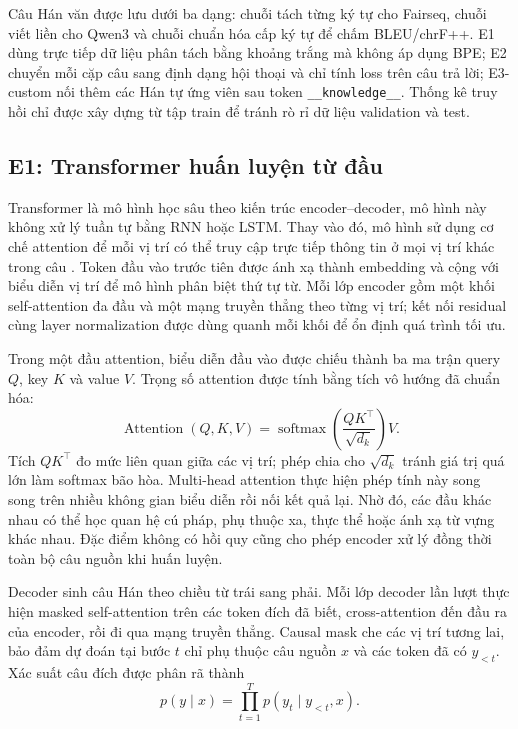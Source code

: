 \documentclass[11pt,twocolumn]{article}
\begin{document}
Câu Hán văn được lưu dưới ba dạng: chuỗi tách từng ký tự cho Fairseq, chuỗi
viết liền cho Qwen3 và chuỗi chuẩn hóa cấp ký tự để chấm BLEU/chrF++. E1 dùng
trực tiếp dữ liệu phân tách bằng khoảng trắng mà không áp dụng BPE; E2 chuyển
mỗi cặp câu sang định dạng hội thoại và chỉ tính loss trên câu trả lời;
E3-custom nối thêm các Hán tự ứng viên sau token
\texttt{\_\_knowledge\_\_}. Thống kê truy hồi chỉ được xây dựng từ tập train
để tránh rò rỉ dữ liệu validation và test.

\subsection{E1: Transformer huấn luyện từ đầu}

Transformer là mô hình học sâu theo kiến trúc encoder--decoder,
mô hình này không xử lý tuần tự bằng RNN hoặc LSTM. Thay vào đó, mô hình sử dụng cơ
chế attention để mỗi vị trí có thể truy cập trực tiếp thông tin ở mọi vị trí
khác trong câu \citep{vaswani2017attention}. Token đầu vào trước tiên được ánh
xạ thành embedding và cộng với biểu diễn vị trí để mô hình phân biệt thứ tự
từ. Mỗi lớp encoder gồm một khối self-attention đa đầu và một mạng truyền thẳng
theo từng vị trí; kết nối residual cùng layer normalization được dùng quanh
mỗi khối để ổn định quá trình tối ưu.

Trong một đầu attention, biểu diễn đầu vào được chiếu thành ba ma trận query
$Q$, key $K$ và value $V$. Trọng số attention được tính bằng tích vô hướng đã
chuẩn hóa:
\begin{equation}
\operatorname{Attention}(Q,K,V)
=\operatorname{softmax}\!\left(\frac{QK^{\top}}{\sqrt{d_k}}\right)V.
\end{equation}
Tích $QK^{\top}$ đo mức liên quan giữa các vị trí; phép chia cho
$\sqrt{d_k}$ tránh giá trị quá lớn làm softmax bão hòa. Multi-head attention
thực hiện phép tính này song song trên nhiều không gian biểu diễn rồi nối kết
quả lại. Nhờ đó, các đầu khác nhau có thể học quan hệ cú pháp, phụ thuộc xa,
thực thể hoặc ánh xạ từ vựng khác nhau. Đặc điểm không có hồi quy cũng cho phép
encoder xử lý đồng thời toàn bộ câu nguồn khi huấn luyện.

Decoder sinh câu Hán theo chiều từ trái sang phải. Mỗi lớp decoder lần lượt
thực hiện masked self-attention trên các token đích đã biết, cross-attention
đến đầu ra của encoder, rồi đi qua mạng truyền thẳng. Causal mask che các vị
trí tương lai, bảo đảm dự đoán tại bước $t$ chỉ phụ thuộc câu nguồn $x$ và các
token đã có $y_{<t}$. Xác suất câu đích được phân rã thành
\begin{equation}
p(y\mid x)=\prod_{t=1}^{T}p(y_t\mid y_{<t},x).
\end{equation}
\end{document}
